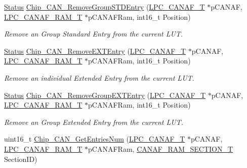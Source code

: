 \begin{DoxyCompactItemize}
\hyperlink{group__LPC__Types__Public__Types_ga67a0db04d321a74b7e7fcfd3f1a3f70b}{Status} \hyperlink{group__CAN__17XX__40XX_ga090e4a29bbaebc8de77bc929438dcfb7}{Chip\-\_\-\-C\-A\-N\-\_\-\-Remove\-Group\-S\-T\-D\-Entry} (\hyperlink{structLPC__CANAF__T}{L\-P\-C\-\_\-\-C\-A\-N\-A\-F\-\_\-\-T} $\ast$p\-C\-A\-N\-A\-F, \hyperlink{structLPC__CANAF__RAM__T}{L\-P\-C\-\_\-\-C\-A\-N\-A\-F\-\_\-\-R\-A\-M\-\_\-\-T} $\ast$p\-C\-A\-N\-A\-F\-Ram, int16\-\_\-t Position)
\begin{DoxyCompactList}\small\item\em Remove an Group Standard Entry from the current L\-U\-T. \end{DoxyCompactList}\item 
\hyperlink{group__LPC__Types__Public__Types_ga67a0db04d321a74b7e7fcfd3f1a3f70b}{Status} \hyperlink{group__CAN__17XX__40XX_ga01e3a9942d50effd9da2a773d3af943f}{Chip\-\_\-\-C\-A\-N\-\_\-\-Remove\-E\-X\-T\-Entry} (\hyperlink{structLPC__CANAF__T}{L\-P\-C\-\_\-\-C\-A\-N\-A\-F\-\_\-\-T} $\ast$p\-C\-A\-N\-A\-F, \hyperlink{structLPC__CANAF__RAM__T}{L\-P\-C\-\_\-\-C\-A\-N\-A\-F\-\_\-\-R\-A\-M\-\_\-\-T} $\ast$p\-C\-A\-N\-A\-F\-Ram, int16\-\_\-t Position)
\begin{DoxyCompactList}\small\item\em Remove an individual Extended Entry from the current L\-U\-T. \end{DoxyCompactList}\item 
\hyperlink{group__LPC__Types__Public__Types_ga67a0db04d321a74b7e7fcfd3f1a3f70b}{Status} \hyperlink{group__CAN__17XX__40XX_gafa0a59577a1c1d38c4c6a339d018c35d}{Chip\-\_\-\-C\-A\-N\-\_\-\-Remove\-Group\-E\-X\-T\-Entry} (\hyperlink{structLPC__CANAF__T}{L\-P\-C\-\_\-\-C\-A\-N\-A\-F\-\_\-\-T} $\ast$p\-C\-A\-N\-A\-F, \hyperlink{structLPC__CANAF__RAM__T}{L\-P\-C\-\_\-\-C\-A\-N\-A\-F\-\_\-\-R\-A\-M\-\_\-\-T} $\ast$p\-C\-A\-N\-A\-F\-Ram, int16\-\_\-t Position)
\begin{DoxyCompactList}\small\item\em Remove an Group Extended Entry from the current L\-U\-T. \end{DoxyCompactList}\item 
uint16\-\_\-t \hyperlink{group__CAN__17XX__40XX_gabf7932e8e5dfd4b8efcd17b1900c53b6}{Chip\-\_\-\-C\-A\-N\-\_\-\-Get\-Entries\-Num} (\hyperlink{structLPC__CANAF__T}{L\-P\-C\-\_\-\-C\-A\-N\-A\-F\-\_\-\-T} $\ast$p\-C\-A\-N\-A\-F, \hyperlink{structLPC__CANAF__RAM__T}{L\-P\-C\-\_\-\-C\-A\-N\-A\-F\-\_\-\-R\-A\-M\-\_\-\-T} $\ast$p\-C\-A\-N\-A\-F\-Ram, \hyperlink{group__CAN__17XX__40XX_gaf0ae33e71a7acfc561972811aa1207e8}{C\-A\-N\-A\-F\-\_\-\-R\-A\-M\-\_\-\-S\-E\-C\-T\-I\-O\-N\-\_\-\-T} Section\-I\-D)

\end{DoxyCompactItemize}
